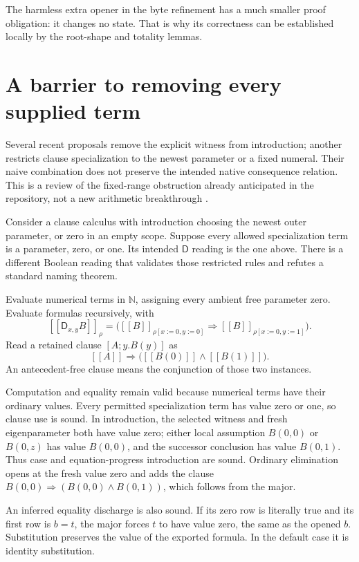 \documentclass[11pt,letterpaper]{article}
\theoremstyle{definition}
\newcommand{\D}{\mathsf D}
\begin{document}
The harmless extra opener in the byte refinement has a much smaller proof
obligation: it changes no state. That is why its correctness can be
established locally by the root-shape and totality lemmas.

\section{A barrier to removing every supplied term}
Several recent proposals remove the explicit witness from introduction;
another restricts clause specialization to the newest parameter or a fixed
numeral. Their naive combination does not preserve the intended native
consequence relation. This is a review of the fixed-range obstruction
already anticipated in the repository, not a new arithmetic breakthrough
\cite{constructed,specialization}.

Consider a clause calculus with introduction choosing the newest outer
parameter, or zero in an empty scope. Suppose every allowed specialization
term is a parameter, zero, or one. Its intended $\D$ reading is the one
above. There is a different Boolean reading that validates those restricted
rules and refutes a standard naming theorem.

Evaluate numerical terms in $\mathbb N$, assigning every ambient free
parameter zero. Evaluate formulas recursively, with
\[
 [\![\D_{x,y}B]\!]_\rho
 =\bigl([\![B]\!]_{\rho[x:=0,y:=0]}
                  \Rightarrow[\![B]\!]_{\rho[x:=0,y:=1]}\bigr).
\]
Read a retained clause $[A;y.B(y)]$ as
\[
 [\![A]\!]\Rightarrow
 \bigl([\![B(0)]\!]\land[\![B(1)]\!]\bigr).
\]
An antecedent-free clause means the conjunction of those two instances.

Computation and equality remain valid because numerical terms have their
ordinary values. Every permitted specialization term has value zero or
one, so clause use is sound. In introduction, the selected witness and
fresh eigenparameter both have value zero; either local assumption
$B(0,0)$ or $B(0,z)$ has value $B(0,0)$, and the successor conclusion has
value $B(0,1)$. Thus case and equation-progress introduction are sound.
Ordinary elimination opens at the fresh value zero and adds the clause
$B(0,0)\Rightarrow(B(0,0)\land B(0,1))$, which follows from the major.

An inferred equality discharge is also sound. If its zero row is literally
true and its first row is $b=t$, the major forces $t$ to have value zero,
the same as the opened $b$. Substitution preserves the value of the
exported formula. In the default case it is identity substitution.
\end{document}
